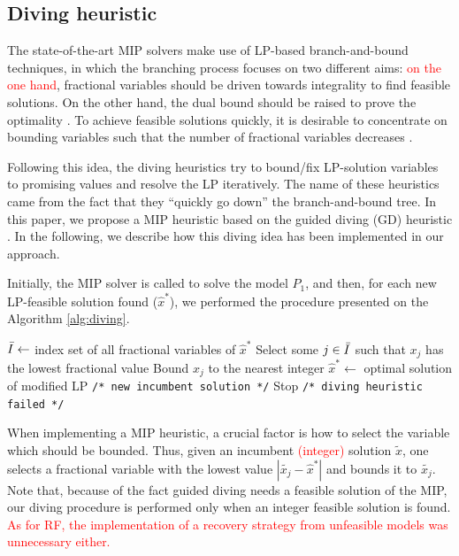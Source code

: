 \documentclass{ro}
\begin{document}
\subsection{Diving heuristic}

The state-of-the-art MIP solvers make use of  LP-based branch-and-bound techniques, in which the branching process focuses on two different aims:  \textcolor{red}{on the one hand}, fractional variables should be driven towards integrality  to find feasible solutions. On the other hand, the dual bound should be raised  to prove the optimality \cite{achterberg2009hybrid}. To achieve feasible solutions quickly, it is desirable to concentrate on bounding variables such that the number of fractional variables decreases \cite{berthold2006primal}.

Following this idea, the diving heuristics try  to bound/fix LP-solution variables to promising values and resolve the LP  iteratively. The name of these heuristics came from the fact that they ``quickly go down'' the branch-and-bound tree. In this paper, we propose a MIP heuristic based on the guided diving (GD) heuristic \cite{achterberg2005branching}. In the following, we describe how this diving idea has been implemented in our approach.


Initially, the MIP solver is called to solve the model $P_1$, and then, for each new LP-feasible solution found ($\hat{x}^*$), we performed the procedure presented on  the Algorithm \ref{alg:diving}.



\begin{algorithm}[!h]
	\caption{\hspace{-1mm}\textbf{: Diving  }($\hat{x}^*$)}
	\label{alg:diving}
	{\footnotesize
		\begin{algorithmic}[1]	
			\STATE  $\Bar{I} \gets$ index set of all fractional variables of $\hat{x}^*$
			\STATE Select some $j \in \Bar{I}$ such that $x_j$ has the lowest fractional value
			\STATE Bound $x_j$ to the nearest integer
			\STATE $\hat{x}^* \gets $ optimal solution of modified LP \texttt{/* new incumbent solution */}
			\ELSE
			\STATE Stop \texttt{/* diving heuristic failed */}
			\ENDIF
			
		\end{algorithmic}
	}
\end{algorithm}

When implementing a MIP heuristic, a crucial factor is
how to select the variable which should be bounded. Thus,  given an incumbent \textcolor{red}{(integer)} solution $\tilde{x}$, one selects a fractional variable with the lowest
value $|\tilde{x_j} - \hat{x}^*|$ and bounds it to $\tilde{x_j}$. Note that, because of the fact guided diving needs a feasible solution of the MIP, our diving procedure is performed only when an integer feasible solution is found. \textcolor{red}{As for RF, the implementation of a recovery strategy from unfeasible models was unnecessary either.}
\end{document}
